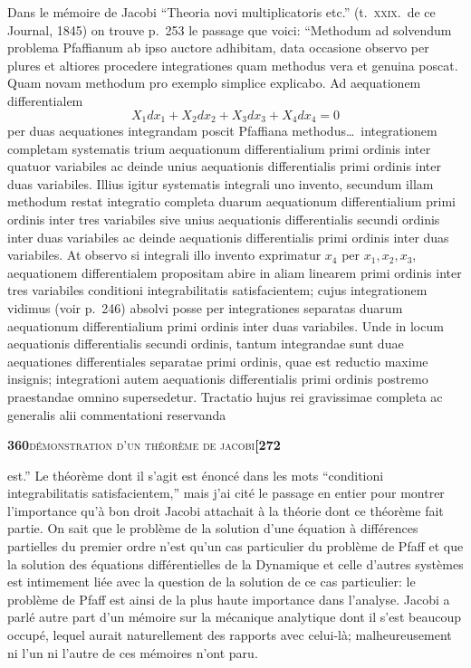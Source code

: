 \documentclass[11pt]{article}
\begin{document}
\noindent Dans le m\'emoire de Jacobi ``Theoria novi multiplicatoris etc.'' (t.~\textsc{xxix}.\ de ce Journal, 1845) on trouve p.~253 le passage que voici: ``Methodum ad solvendum problema Pfaffianum ab ipso auctore adhibitam, data occasione observo per plures et altiores procedere integrationes quam methodus vera et genuina poscat. Quam novam methodum pro exemplo simplice explicabo. Ad aequationem differentialem
\[
X_1 dx_1 + X_2 dx_2 + X_3 dx_3 + X_4 dx_4 = 0
\]
per duas aequationes integrandam poscit Pfaffiana methodus\ldots\ integrationem completam systematis trium aequationum differentialium primi ordinis inter quatuor variabiles ac deinde unius aequationis differentialis primi ordinis inter duas variabiles. Illius igitur systematis integrali uno invento, secundum illam methodum restat integratio completa duarum aequationum differentialium primi ordinis inter tres variabiles sive unius aequationis differentialis secundi ordinis inter duas variabiles ac deinde aequationis differentialis primi ordinis inter duas variabiles. At observo si integrali illo invento exprimatur $x_4$ per $x_1, x_2, x_3$, aequationem differentialem propositam abire in aliam linearem primi ordinis inter tres variabiles conditioni integrabilitatis satisfacientem; cujus integrationem vidimus (voir p.~246) absolvi posse per integrationes separatas duarum aequationum differentialium primi ordinis inter duas variabiles. Unde in locum aequationis differentialis secundi ordinis, tantum integrandae sunt duae aequationes differentiales separatae primi ordinis, quae est reductio maxime insignis; integrationi autem aequationis differentialis primi ordinis postremo praestandae omnino supersedetur. Tractatio hujus rei gravissimae completa ac generalis alii commentationi reservanda

\newpage
\noindent\textbf{360}\hfill\textsc{d\'emonstration d'un th\'eor\`eme de jacobi}\hfill\textbf{[272}

\medskip

\noindent est.'' Le th\'eor\`eme dont il s'agit est \'enonc\'e dans les mots ``conditioni integrabilitatis satisfacientem,'' mais j'ai cit\'e le passage en entier pour montrer l'importance qu'\`a bon droit Jacobi attachait \`a la th\'eorie dont ce th\'eor\`eme fait partie. On sait que le probl\`eme de la solution d'une \'equation \`a diff\'erences partielles du premier ordre n'est qu'un cas particulier du probl\`eme de Pfaff et que la solution des \'equations diff\'erentielles de la Dynamique et celle d'autres syst\`emes est intimement li\'ee avec la question de la solution de ce cas particulier: le probl\`eme de Pfaff est ainsi de la plus haute importance dans l'analyse. Jacobi a parl\'e autre part d'un m\'emoire sur la m\'ecanique analytique dont il s'est beaucoup occup\'e, lequel aurait naturellement des rapports avec celui-l\`a; malheureusement ni l'un ni l'autre de ces m\'emoires n'ont paru.
\end{document}

